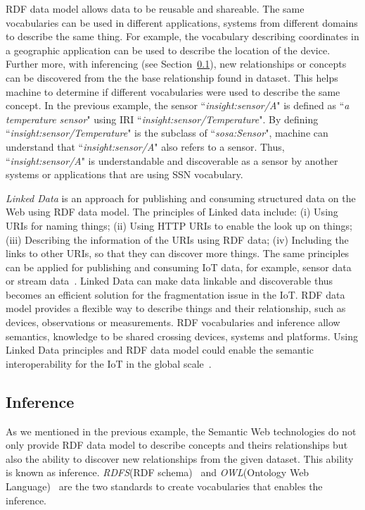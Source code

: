 {RDF data model allows data to be reusable and shareable.
The same vocabularies can be used in different applications, systems from different domains to describe the same thing.
For example, the vocabulary describing coordinates in a geographic application can be used to describe the location of the device.
Further more, with inferencing (see Section~\ref{ss:inference}), new relationships or concepts can be discovered from the the base relationship found in dataset.
This helps machine to determine if different vocabularies were used to describe the same concept.
In the previous example, the sensor ``\textit{insight:sensor/A}" is defined as ``\textit{a temperature sensor}" using IRI ``\textit{insight:sensor/Temperature}".
By defining ``\textit{insight:sensor/Temperature}" is the subclass of ``\textit{sosa:Sensor}", machine can understand that ``\textit{insight:sensor/A}" also refers to a sensor.
Thus, ``\textit{insight:sensor/A}" is understandable and discoverable as a sensor by another systems or applications that are using SSN vocabulary.

\textit{Linked Data} is an approach for publishing and consuming structured data on the Web using RDF data model.
The principles of Linked data include: (i) Using URIs for naming things; (ii) Using HTTP URIs to enable the look up on things; (iii) Describing the information of the URIs using RDF data; (iv) Including the links to other URIs, so that they can discover more things. 
The same principles can be applied for publishing and consuming IoT data, for example, sensor data~\citep{Patni:2010} or stream data~\citep{Sequeda:2009}.
Linked Data can make data linkable and discoverable thus becomes an efficient solution for the fragmentation issue in the IoT.
RDF data model provides a flexible way to describe things and their relationship, such as devices, observations or measurements. 
RDF vocabularies and inference allow semantics, knowledge to be shared crossing devices, systems and platforms. 
Using Linked Data principles and RDF data model could enable the semantic interoperability for the IoT in the global scale~\citep{Le-Phuoc:2018}.

\subsection{Inference}
\label{ss:inference}

As we mentioned in the previous example, the Semantic Web technologies do not only provide RDF data model to describe concepts and theirs relationships but also the ability to discover new relationships from the given dataset.
This ability is known as inference.
\textit{RDFS}(RDF schema)~\citep{Dan:2004} and \textit{OWL}(Ontology Web Language)~\citep{Guinnes:2004} are the two standards to create vocabularies that enables the inference.

}
